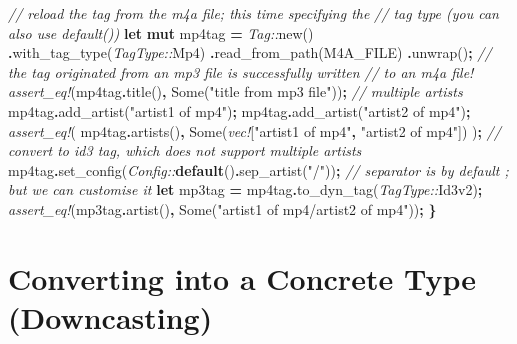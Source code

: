 \documentclass[
]{book}
\newenvironment{Shaded}{\begin{snugshade}}{\end{snugshade}}
\newcommand{\CommentTok}[1]{\textcolor[rgb]{0.56,0.35,0.01}{\textit{#1}}}
\newcommand{\ConstantTok}[1]{\textcolor[rgb]{0.00,0.00,0.00}{#1}}
\newcommand{\KeywordTok}[1]{\textcolor[rgb]{0.13,0.29,0.53}{\textbf{#1}}}
\newcommand{\NormalTok}[1]{#1}
\newcommand{\OperatorTok}[1]{\textcolor[rgb]{0.81,0.36,0.00}{\textbf{#1}}}
\newcommand{\PreprocessorTok}[1]{\textcolor[rgb]{0.56,0.35,0.01}{\textit{#1}}}
\newcommand{\StringTok}[1]{\textcolor[rgb]{0.31,0.60,0.02}{#1}}
\begin{document}
\begin{Shaded}
\begin{Highlighting}[]
    \CommentTok{// reload the tag from the m4a file; this time specifying the}
    \CommentTok{// tag type (you can also use \textasciigrave{}default()\textasciigrave{})}
    \KeywordTok{let} \KeywordTok{mut}\NormalTok{ mp4tag }\OperatorTok{=} \PreprocessorTok{Tag::}\NormalTok{new()}
        \OperatorTok{.}\NormalTok{with\_tag\_type(}\PreprocessorTok{TagType::}\NormalTok{Mp4)}
        \OperatorTok{.}\NormalTok{read\_from\_path(M4A\_FILE)}
        \OperatorTok{.}\NormalTok{unwrap()}\OperatorTok{;}
    \CommentTok{// the tag originated from an mp3 file is successfully written}
    \CommentTok{// to an m4a file!}
    \PreprocessorTok{assert\_eq!}\NormalTok{(mp4tag}\OperatorTok{.}\NormalTok{title()}\OperatorTok{,} \ConstantTok{Some}\NormalTok{(}\StringTok{"title from mp3 file"}\NormalTok{))}\OperatorTok{;}
    \CommentTok{// multiple artists}
\NormalTok{    mp4tag}\OperatorTok{.}\NormalTok{add\_artist(}\StringTok{"artist1 of mp4"}\NormalTok{)}\OperatorTok{;}
\NormalTok{    mp4tag}\OperatorTok{.}\NormalTok{add\_artist(}\StringTok{"artist2 of mp4"}\NormalTok{)}\OperatorTok{;}
    \PreprocessorTok{assert\_eq!}\NormalTok{(}
\NormalTok{        mp4tag}\OperatorTok{.}\NormalTok{artists()}\OperatorTok{,}
        \ConstantTok{Some}\NormalTok{(}\PreprocessorTok{vec!}\NormalTok{[}\StringTok{"artist1 of mp4"}\OperatorTok{,} \StringTok{"artist2 of mp4"}\NormalTok{])}
\NormalTok{    )}\OperatorTok{;}
    \CommentTok{// convert to id3 tag, which does not support multiple artists}
\NormalTok{    mp4tag}\OperatorTok{.}\NormalTok{set\_config(}\PreprocessorTok{Config::}\KeywordTok{default}\NormalTok{()}\OperatorTok{.}\NormalTok{sep\_artist(}\StringTok{"/"}\NormalTok{))}\OperatorTok{;}
    \CommentTok{// separator is by default \textasciigrave{};\textasciigrave{} but we can customise it}
    \KeywordTok{let}\NormalTok{ mp3tag }\OperatorTok{=}\NormalTok{ mp4tag}\OperatorTok{.}\NormalTok{to\_dyn\_tag(}\PreprocessorTok{TagType::}\NormalTok{Id3v2)}\OperatorTok{;}
    \PreprocessorTok{assert\_eq!}\NormalTok{(mp3tag}\OperatorTok{.}\NormalTok{artist()}\OperatorTok{,} \ConstantTok{Some}\NormalTok{(}\StringTok{"artist1 of mp4/artist2 of mp4"}\NormalTok{))}\OperatorTok{;}
\OperatorTok{\}}
\end{Highlighting}
\end{Shaded}

\hypertarget{converting-into-a-concrete-type-downcasting}{%
\section{Converting into a Concrete Type (Downcasting)}\label{converting-into-a-concrete-type-downcasting}}
\end{document}
